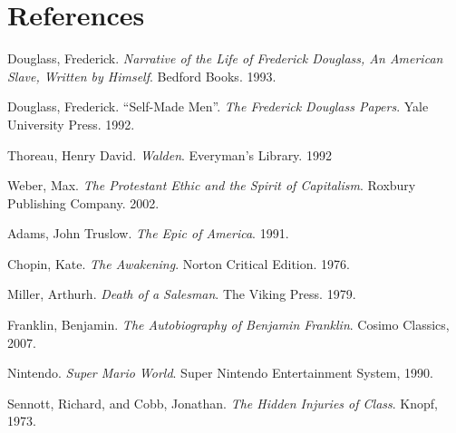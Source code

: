 \section*{References}

\bibent Douglass, Frederick. \textit{Narrative of the Life of Frederick
Douglass, An American Slave, Written by Himself}. Bedford Books. 1993.

\bibent Douglass, Frederick. ``Self-Made Men''. \textit{The Frederick Douglass
Papers}. Yale University Press. 1992.

\bibent Thoreau, Henry David. \textit{Walden}. Everyman's Library. 1992

\bibent Weber, Max. \textit{The Protestant Ethic and the Spirit of Capitalism}.
Roxbury Publishing Company. 2002.

\bibent Adams, John Truslow. \textit{The Epic of America}. 1991.

\bibent Chopin, Kate. \textit{The Awakening}. Norton Critical Edition. 1976.

\bibent Miller, Arthurh. \textit{Death of a Salesman}. The Viking Press. 1979.

\bibent
Franklin, Benjamin. \textit{The Autobiography of Benjamin Franklin}. Cosimo Classics, 2007.

\bibent
Nintendo. \textit{Super Mario World}. Super Nintendo Entertainment System, 1990.

\bibent
Sennott, Richard, and Cobb, Jonathan. \textit{The Hidden Injuries of Class}. Knopf, 1973.

